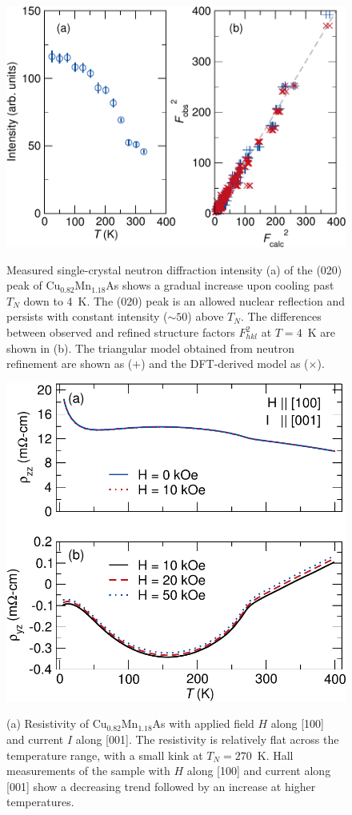 \documentclass[10pt,doublespacing,edeposit]{uiucthesis2020}
\begin{document}
\begin{mainmatter}
\begin{figure}
\centering\includegraphics[width=0.6\columnwidth]{figures/ch5/hb3a_op-fobs_modified_by_manohar_cropped.pdf} \\
\caption{\label{fig:hb3a}
Measured single-crystal neutron diffraction intensity (a) of the (020) peak of Cu$_{0.82}$Mn$_{1.18}$As shows a gradual increase upon cooling past $T_N$ down to 4~K. The (020) peak is an allowed nuclear reflection and persists with constant intensity ($\sim 50$) above $T_N$. The differences between observed and refined structure factors $F_{hkl}^2$ at $T=4$~K are shown in (b). The triangular model obtained from neutron refinement are shown as ($+$) and the DFT-derived model as ($\times$).
} 
\end{figure}

\begin{figure}
\centering\includegraphics[width=0.6\columnwidth]{figures/ch5/resistivity_data_hall_cropped.pdf} \\
\caption{\label{fig:res-data}
(a) Resistivity of Cu$_{0.82}$Mn$_{1.18}$As with applied field $H$ along [100] and current $I$ along [001]. The resistivity is relatively flat across the temperature range, with a small kink at $T_N = 270$~K. Hall measurements of the sample with $H$ along [100] and current along [001] show a decreasing trend followed by an increase at higher temperatures. 
}
\end{figure}


\end{mainmatter}
\end{document}
